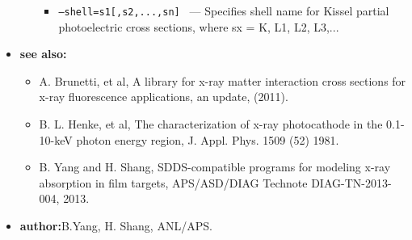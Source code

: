 \begin{itemize}
\begin{itemize}
\begin{itemize}
          \item {\tt --shell=s1[,s2,...,sn] } ---
            Specifies shell name for Kissel partial photoelectric cross sections, where sx = K, L1, L2, L3,... 
        \end{itemize}
    \end{itemize}
\item {\bf see also:}
    \begin{itemize}
    \item A. Brunetti, et al, A library for x-ray matter interaction cross sections for x-ray fluorescence applications, an update, (2011). 
    \item B. L. Henke, et al, The characterization of x-ray photocathode in the 0.1-10-keV photon energy region, J. Appl. Phys. 1509 (52) 1981. 
    \item B. Yang and H. Shang, SDDS-compatible programs for modeling x-ray absorption in film targets, APS/ASD/DIAG Technote DIAG-TN-2013-004, 2013. 
    \end{itemize}
\item {\bf author:}B.Yang, H. Shang, ANL/APS.
\end{itemize}

